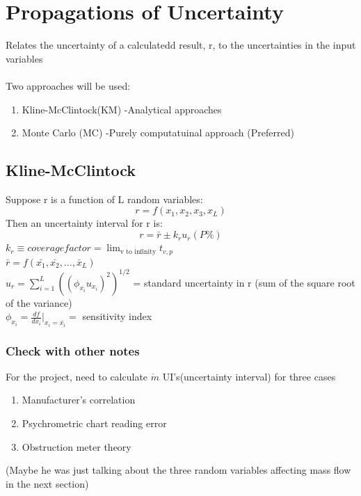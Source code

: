 \documentclass[11pt]{article}
\begin{document}
\section{Propagations of Uncertainty}
Relates the uncertainty of a calculatedd result, r, to the uncertainties in the input variables
\\~\\
Two approaches will be used:
\begin{enumerate}
    \item Kline-McClintock(KM)
    -Analytical approaches
    \item Monte Carlo (MC)
    -Purely computatuinal approach (Preferred)
\end{enumerate}
\subsection{Kline-McClintock}
Suppose r is a function of L random variables: $$r = f(x_1,x_2,x_3,x_L)$$
Then an uncertainty interval for r is:
$$r = \bar{r} \pm k_r u_r (P\%)$$
$k_r \equiv coverage factor = \lim_{\text{v to infinity}}t_{v,p}$
\\
$\bar{r} = f(\bar{x_1},\bar{x_2},\dots, \bar{x}_L)$
\\$u_r = \sum_{i=1}^{L}((\phi_{x_i}u_{x_i})^2)^{1/2}$ = standard uncertainty in r (sum of the square root of the variance) 
\\
$\phi_{x_i}=\frac{df}{dx_i}\bigg|_{x_i=\bar{x_i}}=$ sensitivity index
\subsubsection{Check with other notes}
For the project, need to calculate $\dot{m}$ UI's(uncertainty interval) for three cases
\begin{enumerate}
    \item Manufacturer's correlation
    \item Psychrometric chart reading error
    \item Obstruction meter theory
\end{enumerate}
(Maybe he was just talking about the three random variables affecting mass flow in the next section)
\end{document}
